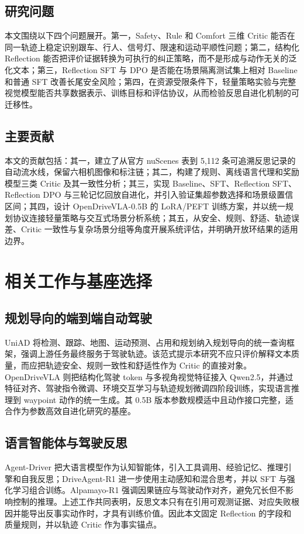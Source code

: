 \documentclass[UTF8,a4paper,12pt,fontset=fandol]{ctexart}
\begin{document}
\subsection{研究问题}
本文围绕以下四个问题展开。第一，Safety、Rule 和 Comfort 三维 Critic 能否在同一轨迹上稳定识别跟车、行人、信号灯、限速和运动平顺性问题；第二，结构化 Reflection 能否把评价证据转换为可执行的纠正策略，而不是形成与动作无关的泛化文本；第三，Reflection SFT 与 DPO 是否能在场景隔离测试集上相对 Baseline 和普通 SFT 改善长尾安全风险；第四，在资源受限条件下，轻量策略实验与完整视觉模型能否共享数据表示、训练目标和评估协议，从而检验反思自进化机制的可迁移性。

\subsection{主要贡献}
本文的贡献包括：其一，建立了从官方 nuScenes 表到 5,112 条可追溯反思记录的自动流水线，保留六相机图像和标注链；其二，构建了规则、离线语言代理和奖励模型三类 Critic 及其一致性分析；其三，实现 Baseline、SFT、Reflection SFT、Reflection DPO 与三轮记忆回放自进化，并引入验证集超参数选择和场景级置信区间；其四，设计 OpenDriveVLA-0.5B 的 LoRA/PEFT 训练方案，并以统一规划协议连接轻量策略与交互式场景分析系统；其五，从安全、规则、舒适、轨迹误差、Critic 一致性与复杂场景分组等角度开展系统评估，并明确开放环结果的适用边界。

\section{相关工作与基座选择}
\subsection{规划导向的端到端自动驾驶}
UniAD 将检测、跟踪、地图、运动预测、占用和规划纳入规划导向的统一查询框架，强调上游任务最终服务于驾驶轨迹。该范式提示本研究不应只评价解释文本质量，而应把轨迹安全、规则一致性和舒适性作为 Critic 的直接对象。OpenDriveVLA 则把结构化驾驶 token 与多视角视觉特征接入 Qwen2.5，并通过特征对齐、驾驶指令微调、环境交互学习与轨迹规划微调四阶段训练，实现语言推理到 waypoint 动作的统一生成。其 0.5B 版本参数规模适中且动作接口完整，适合作为参数高效自进化研究的基座。

\subsection{语言智能体与驾驶反思}
Agent-Driver 把大语言模型作为认知智能体，引入工具调用、经验记忆、推理引擎和自我反思；DriveAgent-R1 进一步使用主动感知和混合思考，并以 SFT 与强化学习组合训练。Alpamayo-R1 强调因果链应与驾驶动作对齐，避免冗长但不影响控制的推理。上述工作共同表明，反思文本只有在引用可观测证据、对应失败根因并能导出反事实动作时，才具有训练价值。因此本文固定 Reflection 的字段和质量规则，并以轨迹 Critic 作为事实锚点。
\end{document}
